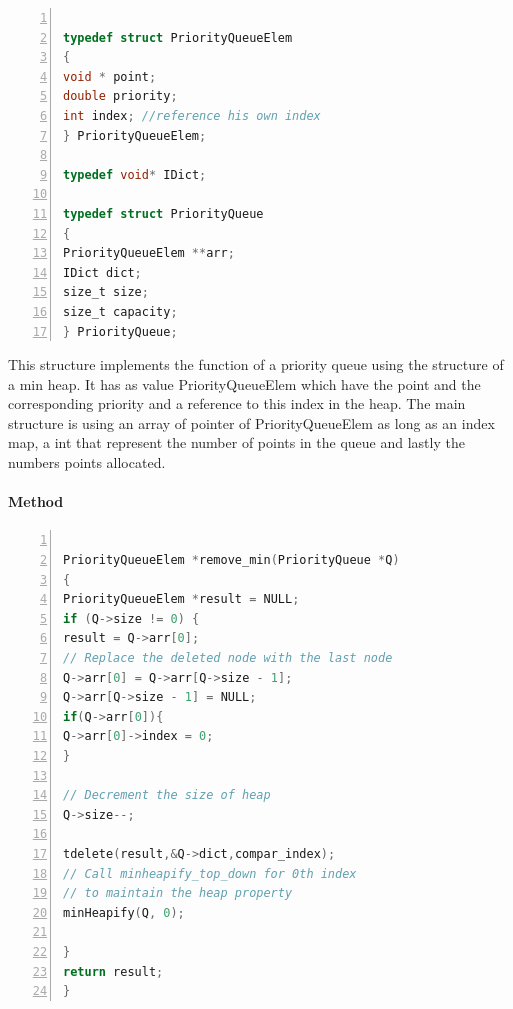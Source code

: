 \begin{lstlisting}[language=C, % Spécifie le langage du code
caption={PriorityQueue}, % Légende du listing
label=lst:prqueue_c, % Étiquette pour référencer le listing
numbers=left,
numberstyle=\tiny\color{gray},
stepnumber=1,
frame=single,
breaklines=true,
postbreak=\mbox{\textcolor{red}{$\hookrightarrow$}\space},
showstringspaces=false
]

typedef struct PriorityQueueElem
{
void * point;
double priority;
int index; //reference his own index
} PriorityQueueElem;

typedef void* IDict;

typedef struct PriorityQueue
{
PriorityQueueElem **arr;
IDict dict;
size_t size;
size_t capacity;
} PriorityQueue;

\end{lstlisting}
\vspace{1cm}
This structure implements the function of a priority queue using the structure of a min heap. It has as value PriorityQueueElem which have the point and the corresponding priority and a reference to this index in the heap. The main structure is using an array of pointer of PriorityQueueElem as long as an index map, a int that represent the number of points in the queue and lastly the numbers points allocated.

\paragraph{Method}

\begin{lstlisting}[language=C, % Spécifie le langage du code
	caption={PriorityQueue Remove Min}, % Légende du listing
	label=lst:prqueueMethodR_c, % Étiquette pour référencer le listing
	numbers=left,
	numberstyle=\tiny\color{gray},
	stepnumber=1,
	frame=single,
	breaklines=true,
	postbreak=\mbox{\textcolor{red}{$\hookrightarrow$}\space},
	showstringspaces=false
]
	
PriorityQueueElem *remove_min(PriorityQueue *Q)
{
PriorityQueueElem *result = NULL;
if (Q->size != 0) {
result = Q->arr[0];
// Replace the deleted node with the last node
Q->arr[0] = Q->arr[Q->size - 1];
Q->arr[Q->size - 1] = NULL;
if(Q->arr[0]){
Q->arr[0]->index = 0;
}

// Decrement the size of heap
Q->size--;

tdelete(result,&Q->dict,compar_index);
// Call minheapify_top_down for 0th index
// to maintain the heap property
minHeapify(Q, 0);

}
return result;
}
\end{lstlisting}

